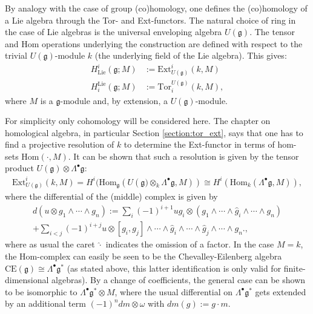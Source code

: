     By analogy with the case of group (co)homology, one defines the (co)homology of a Lie algebra through the Tor- and Ext-functors. The natural choice of ring in the case of Lie algebras is the universal enveloping algebra $U(\mathfrak{g})$. The tensor and Hom operations underlying the construction are defined with respect to the trivial $U(\mathfrak{g})$-module $k$ (the underlying field of the Lie algebra). This gives:
    \begin{align}
        H^i_{\text{Lie}}(\mathfrak{g};M) &:= \text{Ext}^i_{U(\mathfrak{g})}(k,M)\\
        H_i^{\text{Lie}}(\mathfrak{g};M) &:= \text{Tor}_i^{U(\mathfrak{g})}(k,M),
    \end{align}
    where $M$ is a $\mathfrak{g}$-module and, by extension, a $U(\mathfrak{g})$-module.

    For simplicity only cohomology will be considered here. The chapter on homological algebra, in particular Section \ref{section:tor_ext}, says that one has to find a projective resolution of $k$ to determine the Ext-functor in terms of hom-sets $\text{Hom}(\cdot, M)$. It can be shown that such a resolution is given by the tensor product $U(\mathfrak{g})\otimes\Lambda^\bullet\mathfrak{g}$:
    \begin{gather}
        \text{Ext}^i_{U(\mathfrak{g})}(k, M) = H^i(\text{Hom}_{\mathfrak{g}}(U(\mathfrak{g)}\otimes_k\Lambda^\bullet\mathfrak{g}, M)) \cong H^i(\text{Hom}_k(\Lambda^\bullet\mathfrak{g}, M)),
    \end{gather}
    where the differential of the (middle) complex is given by
    \begin{gather}
        d(u\otimes g_1\wedge\cdots\wedge g_n) := \sum_i(-1)^{i+1}ug_i\otimes(g_1\wedge\cdots\wedge\hat{g}_i\wedge\cdots\wedge g_n)\\+ \sum_{i<j}(-1)^{i+j}u\otimes[g_i,g_j]\wedge\cdots\wedge\hat{g}_i\wedge\cdots\wedge\hat{g}_j\wedge\cdots\wedge g_n.\nonumber,
    \end{gather}
    where as usual the caret $\hat\cdot$ indicates the omission of a factor. In the case $M=k$, the Hom-complex can easily be seen to be the Chevalley-Eilenberg algebra $\text{CE}(\mathfrak{g})\cong\Lambda^\bullet\mathfrak{g}^*$ (as stated above, this latter identification is only valid for finite-dimensional algebras). By a change of coefficients, the general case can be shown to be isomorphic to $\Lambda^\bullet\mathfrak{g}^*\otimes M$, where the usual differential on $\Lambda^\bullet\mathfrak{g}^*$ gets extended by an additional term $(-1)^n dm\otimes\omega$ with $dm(g):=g\cdot m$.

